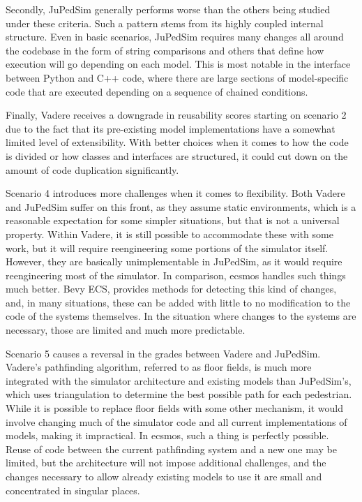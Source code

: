 \documentclass[twoside, 11pt]{article}
\begin{document}
Secondly, JuPedSim generally performs worse than the others being studied under these criteria. Such a pattern stems from its highly coupled internal structure. Even in basic scenarios, JuPedSim requires many changes all around the codebase in the form of string comparisons and others that define how execution will go depending on each model. This is most notable in the interface between Python and C++ code, where there are large sections of model-specific code that are executed depending on a sequence of chained conditions.

Finally, Vadere receives a downgrade in reusability scores starting on scenario 2 due to the fact that its pre-existing model implementations have a somewhat limited level of extensibility. With better choices when it comes to how the code is divided or how classes and interfaces are structured, it could cut down on the amount of code duplication significantly.

Scenario 4 introduces more challenges when it comes to flexibility. Both Vadere and JuPedSim suffer on this front, as they assume static environments, which is a reasonable expectation for some simpler situations, but that is not a universal property. Within Vadere, it is still possible to accommodate these with some work, but it will require reengineering some portions of the simulator itself. However, they are basically unimplementable in JuPedSim, as it would require reengineering most of the simulator. In comparison, \gls{ecsmos} handles such things much better. Bevy ECS, provides methods for detecting this kind of changes, and, in many situations, these can be added with little to no modification to the code of the systems themselves. In the situation where changes to the systems are necessary, those are limited and much more predictable. 

Scenario 5 causes a reversal in the grades between Vadere and JuPedSim. Vadere's pathfinding algorithm, referred to as floor fields, is much more integrated with the simulator architecture and existing models than JuPedSim's, which uses triangulation to determine the best possible path for each pedestrian. While it is possible to replace floor fields with some other mechanism, it would involve changing much of the simulator code and all current implementations of models, making it impractical. In \gls{ecsmos}, such a thing is perfectly possible. Reuse of code between the current pathfinding system and a new one may be limited, but the architecture will not impose additional challenges, and the changes necessary to allow already existing models to use it are small and concentrated in singular places.
\end{document}
